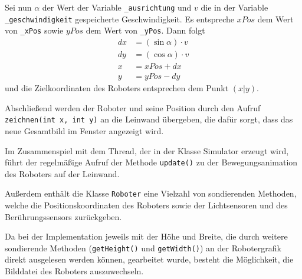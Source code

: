 \documentclass[paper=a4, DIV=calc, BCOR=12mm, twoside=on, onecolumn=on, open = right, titlepage =on, parskip =half-, headsepline = on, footsepline = off, chapterprefix = off, appendixprefix = on, fontsize = 12pt, numbers = noenddot, abstract = on]{scrbook}
\begin{document}
Sei nun $\alpha$ der Wert der Variable \texttt{{\_}ausrichtung} und $v$ die in der Variable \texttt{{\_}ge\-schwin\-dig\-keit} gespeicherte Geschwindigkeit. Es entspreche $xPos$ dem Wert von \texttt{{\_}xPos} sowie $yPos$ dem Wert von \texttt{{\_}yPos}. Dann folgt
\begin{align*}
dx & = \left( \sin \alpha \right) \cdot v\\
dy & = \left( \cos \alpha \right) \cdot v\\
x & = xPos + dx\\
y & = yPos - dy
\end{align*}
und die Zielkoordinaten des Roboters entsprechen dem Punkt $\left( x \vert y \right)$.

Abschließend werden der Roboter und seine Position durch den Aufruf \texttt{zeich\-nen(int x, int y)} an die Leinwand übergeben, die dafür sorgt, dass das neue Gesamtbild im Fenster angezeigt wird.

Im Zusammenspiel mit dem Thread, der in der Klasse Simulator erzeugt wird, führt der regelmäßige Aufruf der Methode \texttt{update()} zu der Bewegungsanimation des Roboters auf der Leinwand.


Außerdem enthält die Klasse \texttt{Roboter} eine Vielzahl von sondierenden Methoden, welche die Positionskoordinaten des Roboters sowie der Lichtsensoren und des Berührungssensors zurückgeben.

Da bei der Implementation jeweils mit der Höhe und Breite, die durch weitere sondierende Methoden (\texttt{getHeight()} und \texttt{getWidth()}) an der Robotergrafik direkt ausgelesen werden können, gearbeitet wurde, besteht die Möglichkeit, die Bilddatei des Roboters auszuwechseln.
\end{document}
